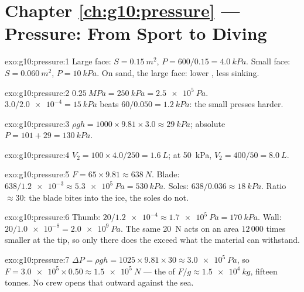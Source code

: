 \section*{Chapter \ref{ch:g10:pressure} --- Pressure: From Sport to Diving}

\begin{solution}{exo:g10:pressure:1}
Large face: $S = \qty{0.15}{m^2}$, $P = 600/0.15 = \qty{4.0}{kPa}$.
Small face: $S = \qty{0.060}{m^2}$, $P = \qty{10}{kPa}$. On sand, the
large face: lower , less sinking.
\end{solution}

\begin{solution}{exo:g10:pressure:2}
$\qty{0.25}{MPa} = \qty{250}{kPa} = \qty{2.5e5}{Pa}$.
$3.0/\num{2.0e-4} = \qty{15}{kPa}$ beats
$60/0.050 = \qty{1.2}{kPa}$: the small  presses harder.
\end{solution}

\begin{solution}{exo:g10:pressure:3}
$\rho g h = 1000 \times 9.81 \times 3.0 \approx \qty{29}{kPa}$;
absolute $P = 101 + 29 = \qty{130}{kPa}$.
\end{solution}

\begin{solution}{exo:g10:pressure:4}
$V_2 = 100 \times 4.0 / 250 = \qty{1.6}{L}$;
at \qty{50}{kPa}, $V_2 = 400/50 = \qty{8.0}{L}$.
\end{solution}

\begin{solution}{exo:g10:pressure:5}
$F = 65 \times 9.81 \approx \qty{638}{N}$. Blade:
$638/\num{1.2e-3} \approx \qty{5.3e5}{Pa} = \qty{530}{kPa}$. Soles:
$638/0.036 \approx \qty{18}{kPa}$. Ratio $\approx 30$: the blade bites
into the ice, the soles do not.
\end{solution}

\begin{solution}{exo:g10:pressure:6}
Thumb: $20/\num{1.2e-4} \approx \qty{1.7e5}{Pa} = \qty{170}{kPa}$.
Wall: $20/\num{1.0e-8} = \qty{2.0e9}{Pa}$. The same \qty{20}{N} acts on
an area $12\,000$ times smaller at the tip, so only there does the
 exceed what the material can withstand.
\end{solution}

\begin{solution}{exo:g10:pressure:7}
$\Delta P = \rho g h = 1025 \times 9.81 \times 30 \approx
\qty{3.0e5}{Pa}$, so
$F = \num{3.0e5} \times 0.50 \approx \qty{1.5e5}{N}$ --- the  of
$F/g \approx \qty{1.5e4}{kg}$, fifteen tonnes. No crew opens that
outward against the sea.
\end{solution}

